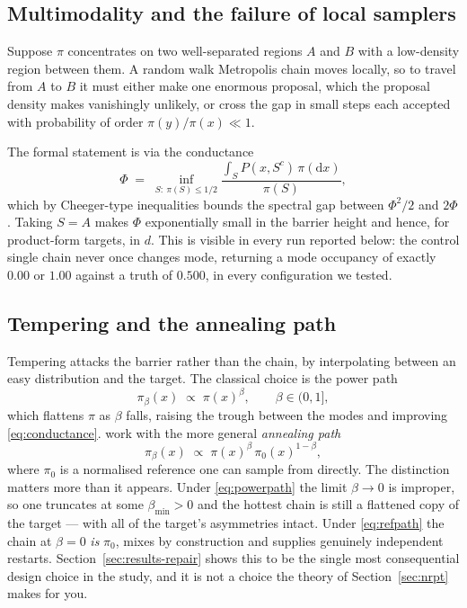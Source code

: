 \subsection{Multimodality and the failure of local samplers}

Suppose $\pi$ concentrates on two well-separated regions $A$ and $B$ with a
low-density region between them. A random walk Metropolis chain moves locally, so
to travel from $A$ to $B$ it must either make one enormous proposal, which the
proposal density makes vanishingly unlikely, or cross the gap in small steps each
accepted with probability of order $\pi(y)/\pi(x)\ll 1$.

The formal statement is via the conductance
\begin{equation}
  \Phi\;=\;\inf_{S:\ \pi(S)\le 1/2}
   \frac{\int_S P(x,S^c)\,\pi(\mathrm dx)}{\pi(S)},
  \label{eq:conductance}
\end{equation}
which by Cheeger-type inequalities bounds the spectral gap between $\Phi^2/2$ and
$2\Phi$. Taking $S=A$ makes $\Phi$ exponentially small in the barrier height and
hence, for product-form targets, in $d$. This is visible in every run reported
below: the control single chain never once changes mode, returning a mode
occupancy of exactly $0.00$ or $1.00$ against a truth of $0.500$, in every
configuration we tested.

\subsection{Tempering and the annealing path}

Tempering attacks the barrier rather than the chain, by interpolating between an
easy distribution and the target. The classical choice is the power path
\begin{equation}
  \pi_\beta(x)\;\propto\;\pi(x)^\beta,\qquad \beta\in(0,1],
  \label{eq:powerpath}
\end{equation}
which flattens $\pi$ as $\beta$ falls, raising the trough between the modes and
improving \eqref{eq:conductance}. \citet{syed2022} work with the more general
\emph{annealing path}
\begin{equation}
  \pi_\beta(x)\;\propto\;\pi(x)^{\beta}\,\pi_0(x)^{1-\beta},
  \label{eq:refpath}
\end{equation}
where $\pi_0$ is a normalised reference one can sample from directly. The
distinction matters more than it appears. Under \eqref{eq:powerpath} the limit
$\beta\to0$ is improper, so one truncates at some $\beta_{\min}>0$ and the
hottest chain is still a flattened copy of the target --- with all of the
target's asymmetries intact. Under \eqref{eq:refpath} the chain at $\beta=0$
\emph{is} $\pi_0$, mixes by construction and supplies genuinely independent
restarts. Section~\ref{sec:results-repair} shows this to be the single most
consequential design choice in the study, and it is not a choice the theory of
Section~\ref{sec:nrpt} makes for you.

